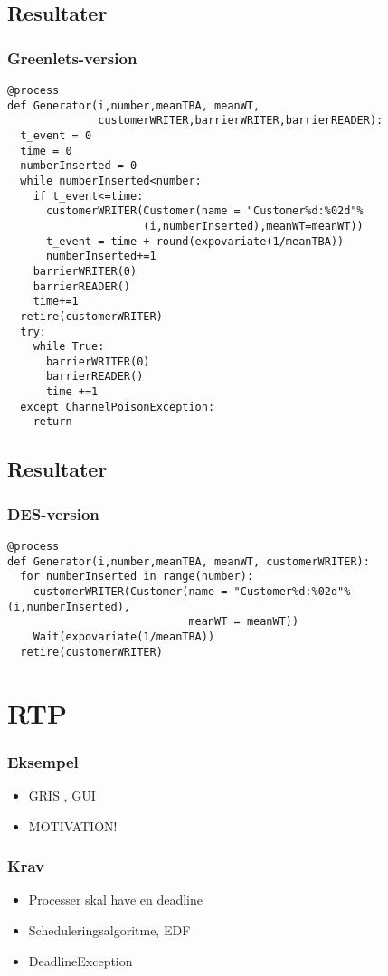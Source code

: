\documentclass[12pt]{beamer}
\begin{document}

\subsection{Resultater}
\begin{frame}[fragile]
  \frametitle{Greenlets-version}
\begin{lstlisting}
@process
def Generator(i,number,meanTBA, meanWT,
              customerWRITER,barrierWRITER,barrierREADER):
  t_event = 0
  time = 0
  numberInserted = 0
  while numberInserted<number:
    if t_event<=time:
      customerWRITER(Customer(name = "Customer%d:%02d"%
                     (i,numberInserted),meanWT=meanWT))
      t_event = time + round(expovariate(1/meanTBA))
      numberInserted+=1
    barrierWRITER(0)
    barrierREADER()
    time+=1
  retire(customerWRITER)
  try:
    while True:
      barrierWRITER(0)
      barrierREADER()
      time +=1
  except ChannelPoisonException: 
    return
\end{lstlisting}
\end{frame}

\subsection{Resultater}
\begin{frame}[fragile]
  \frametitle{DES-version}
\begin{lstlisting}
@process
def Generator(i,number,meanTBA, meanWT, customerWRITER):
  for numberInserted in range(number):
    customerWRITER(Customer(name = "Customer%d:%02d"%(i,numberInserted),
                            meanWT = meanWT))
    Wait(expovariate(1/meanTBA))
  retire(customerWRITER)
\end{lstlisting}
\end{frame}

\section{RTP}
\begin{frame}
  \frametitle{Eksempel}
  \begin{itemize}   
    \item GRIS , GUI	
    \item MOTIVATION!
  \end{itemize}
\end{frame}

\begin{frame}
  \frametitle{Krav}
  \begin{itemize}   
	\item Processer skal have en  deadline
	\item Scheduleringsalgoritme, EDF
	\item DeadlineException
  \end{itemize}
\end{frame}
\end{document}
